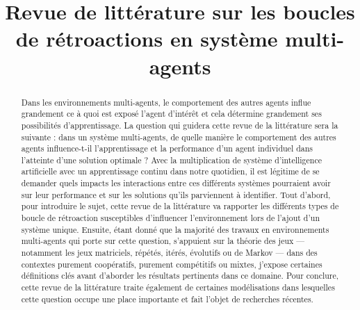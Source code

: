 \documentclass{article}
\title{Revue de littérature sur les boucles de rétroactions en système multi-agents}
\theoremstyle{definition}
\begin{document}
\maketitle

\begin{abstract}
Dans les environnements multi-agents, le comportement des autres agents influe grandement ce à quoi est exposé l'agent d’intérêt et cela détermine grandement ses possibilités d'apprentissage. La question qui guidera cette revue de la littérature sera la suivante : dans un système multi-agents, de quelle manière le comportement des autres agents influence-t-il l’apprentissage et la performance d’un agent individuel dans l’atteinte d’une solution optimale ? Avec la multiplication de système d'intelligence artificielle avec un apprentissage continu dans notre quotidien, il est légitime de se demander quels impacts les interactions entre ces différents systèmes pourraient avoir sur leur performance et sur les solutions qu’ils parviennent à identifier. Tout d'abord, pour introduire le 
sujet, cette revue de la littérature va rapporter les différents types de boucle de rétroaction susceptibles d’influencer l’environnement lors de l’ajout d’un système unique. Ensuite, étant donné que la majorité des travaux en environnements multi-agents qui porte sur cette question, s’appuient sur la théorie des jeux — notamment les jeux matriciels, répétés, itérés, évolutifs ou de Markov — dans des contextes purement coopératifs, purement compétitifs ou mixtes, j'expose certaines définitions clés avant d’aborder les résultats pertinents dans ce domaine. Pour conclure, cette revue de la littérature traite également de certaines modélisations dans lesquelles cette question occupe une place importante et fait l’objet de recherches récentes.


\end{abstract}
\end{document}
